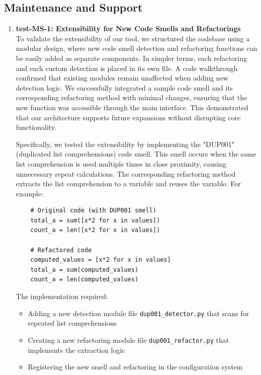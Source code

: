 \documentclass[12pt, titlepage]{article}
\begin{document}
\subsection{Maintenance and Support}
\begin{enumerate}

  \item \textbf{test-MS-1: Extensibility for New Code Smells and
    Refactorings} \\[2mm]
    To validate the extensibility of our tool, we structured the
    codebase using a modular design, where new code smell detection
    and refactoring functions can
    be easily added as separate components. In simpler terms, each
    refactoring and each custom detection is placed in its own file.
    A code walkthrough confirmed that
    existing modules remain unaffected when adding new detection
    logic. We successfully integrated a sample code smell and its
    corresponding refactoring method with
    minimal changes, ensuring that the new function was accessible
    through the main interface. This demonstrated that our
    architecture supports future expansions without
    disrupting core functionality.
    
    Specifically, we tested the extensibility by implementing the "DUP001" (duplicated list comprehensions) code smell. This smell occurs when the same list comprehension is used multiple times in close proximity, causing unnecessary repeat calculations. The corresponding refactoring method extracts the list comprehension to a variable and reuses the variable. For example:
    
    \begin{verbatim}
    # Original code (with DUP001 smell)
    total_a = sum([x*2 for x in values])
    count_a = len([x*2 for x in values])
    
    # Refactored code
    computed_values = [x*2 for x in values]
    total_a = sum(computed_values)
    count_a = len(computed_values)
    \end{verbatim}
    
    The implementation required:
    \begin{itemize}
      \item Adding a new detection module file \texttt{dup001\_detector.py} that scans for repeated list comprehensions
      \item Creating a new refactoring module file \texttt{dup001\_refactor.py} that implements the extraction logic
      \item Registering the new smell and refactoring in the configuration system
    \end{itemize}
    

\end{enumerate}
\end{document}
